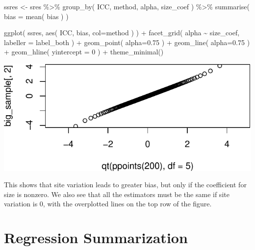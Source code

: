 \documentclass[
]{book}
\newenvironment{Shaded}{\begin{snugshade}}{\end{snugshade}}
\newcommand{\AttributeTok}[1]{\textcolor[rgb]{0.77,0.63,0.00}{#1}}
\newcommand{\DecValTok}[1]{\textcolor[rgb]{0.00,0.00,0.81}{#1}}
\newcommand{\FloatTok}[1]{\textcolor[rgb]{0.00,0.00,0.81}{#1}}
\newcommand{\FunctionTok}[1]{\textcolor[rgb]{0.00,0.00,0.00}{#1}}
\newcommand{\NormalTok}[1]{#1}
\newcommand{\OtherTok}[1]{\textcolor[rgb]{0.56,0.35,0.01}{#1}}
\newcommand{\SpecialCharTok}[1]{\textcolor[rgb]{0.00,0.00,0.00}{#1}}
\begin{document}
\begin{Shaded}
\begin{Highlighting}[]
\NormalTok{ssres }\OtherTok{\textless{}{-}} 
\NormalTok{  sres }\SpecialCharTok{\%\textgreater{}\%} 
  \FunctionTok{group\_by}\NormalTok{( ICC, method, alpha, size\_coef ) }\SpecialCharTok{\%\textgreater{}\%}
  \FunctionTok{summarise}\NormalTok{( }\AttributeTok{bias =} \FunctionTok{mean}\NormalTok{( bias ) )}

\FunctionTok{ggplot}\NormalTok{( ssres, }\FunctionTok{aes}\NormalTok{( ICC, bias, }\AttributeTok{col=}\NormalTok{method ) ) }\SpecialCharTok{+}
  \FunctionTok{facet\_grid}\NormalTok{( alpha }\SpecialCharTok{\textasciitilde{}}\NormalTok{  size\_coef, }\AttributeTok{labeller =}\NormalTok{ label\_both ) }\SpecialCharTok{+}
  \FunctionTok{geom\_point}\NormalTok{( }\AttributeTok{alpha=}\FloatTok{0.75}\NormalTok{ ) }\SpecialCharTok{+} 
  \FunctionTok{geom\_line}\NormalTok{( }\AttributeTok{alpha=}\FloatTok{0.75}\NormalTok{ ) }\SpecialCharTok{+}
  \FunctionTok{geom\_hline}\NormalTok{( }\AttributeTok{yintercept =} \DecValTok{0}\NormalTok{ ) }\SpecialCharTok{+}
  \FunctionTok{theme\_minimal}\NormalTok{()}
\end{Highlighting}
\end{Shaded}

\begin{center}\includegraphics[width=0.75\linewidth]{Designing-Simulations-in-R_files/figure-latex/unnamed-chunk-116-1} \end{center}

This shows that site variation leads to greater bias, but only if the coefficient for size is nonzero.
We also see that all the estimators must be the same if site variation is 0, with the overplotted lines on the top row of the figure.

\hypertarget{regression-summarization}{%
\section{Regression Summarization}\label{regression-summarization}}
\end{document}
